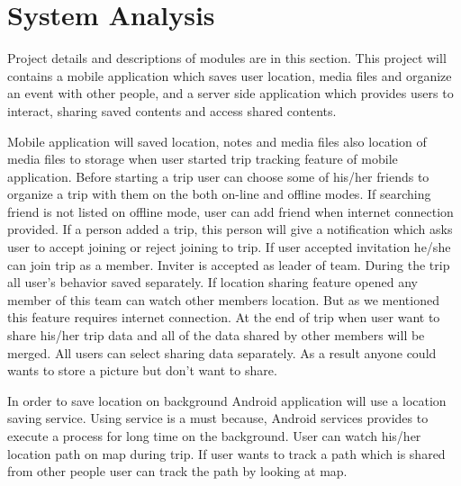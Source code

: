 \chapter{System Analysis}
Project details and descriptions of modules are in this section.
This project will contains a mobile application which saves user location, media files and organize an event with other people, and a server side application which provides users to interact, sharing saved contents and access shared contents. 

Mobile application will saved location, notes and media files also location of media files to storage when user started trip tracking feature of mobile application. Before starting a trip user can choose some of his/her friends to organize a trip with them on the both on-line and offline modes. If searching friend is not listed on offline mode, user can add friend when internet connection provided. If a person added a trip, this person will give a notification which asks user to accept joining or reject joining to trip. If user accepted invitation he/she can join trip as a member. Inviter is accepted as leader of team. During the trip all user's behavior saved separately. If location sharing feature opened any member of this team can watch other members location. But as we mentioned this feature requires internet connection. At the end of trip when user want to share his/her trip data and all of the data shared by other members will be merged. All users can select sharing data separately. As a result anyone could wants to store a picture but don't want to share. 

In order to save location on background Android application will use a location saving service. Using service is a must because, Android services provides to execute a process for long time on the background. User can watch his/her location path on map during trip. If user wants to track a path which is shared from other people user can track the path by looking at map.

